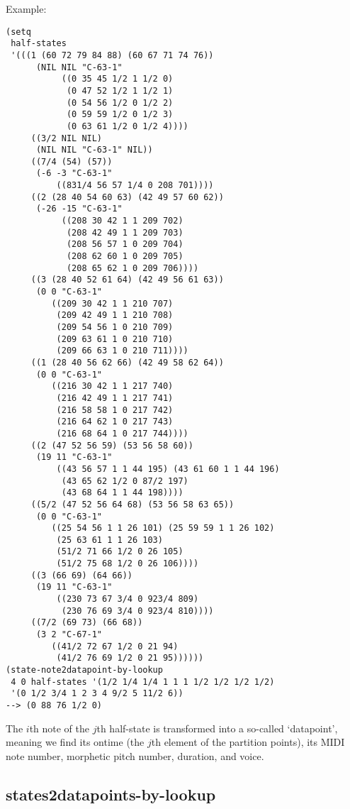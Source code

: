 \vspace{0.5cm}
\noindent Example:
\begin{verbatim}
(setq
 half-states
 '(((1 (60 72 79 84 88) (60 67 71 74 76))
      (NIL NIL "C-63-1"
           ((0 35 45 1/2 1 1/2 0)
            (0 47 52 1/2 1 1/2 1)
            (0 54 56 1/2 0 1/2 2)
            (0 59 59 1/2 0 1/2 3)
            (0 63 61 1/2 0 1/2 4))))
     ((3/2 NIL NIL)
      (NIL NIL "C-63-1" NIL))
     ((7/4 (54) (57))
      (-6 -3 "C-63-1"
          ((831/4 56 57 1/4 0 208 701))))
     ((2 (28 40 54 60 63) (42 49 57 60 62))
      (-26 -15 "C-63-1"
           ((208 30 42 1 1 209 702)
            (208 42 49 1 1 209 703)
            (208 56 57 1 0 209 704)
            (208 62 60 1 0 209 705)
            (208 65 62 1 0 209 706))))
     ((3 (28 40 52 61 64) (42 49 56 61 63))
      (0 0 "C-63-1"
         ((209 30 42 1 1 210 707)
          (209 42 49 1 1 210 708)
          (209 54 56 1 0 210 709)
          (209 63 61 1 0 210 710)
          (209 66 63 1 0 210 711))))
     ((1 (28 40 56 62 66) (42 49 58 62 64))
      (0 0 "C-63-1"
         ((216 30 42 1 1 217 740)
          (216 42 49 1 1 217 741)
          (216 58 58 1 0 217 742)
          (216 64 62 1 0 217 743)
          (216 68 64 1 0 217 744))))
     ((2 (47 52 56 59) (53 56 58 60))
      (19 11 "C-63-1" 
          ((43 56 57 1 1 44 195) (43 61 60 1 1 44 196)
           (43 65 62 1/2 0 87/2 197)
           (43 68 64 1 1 44 198))))
     ((5/2 (47 52 56 64 68) (53 56 58 63 65))
      (0 0 "C-63-1"
         ((25 54 56 1 1 26 101) (25 59 59 1 1 26 102)
          (25 63 61 1 1 26 103)
          (51/2 71 66 1/2 0 26 105)
          (51/2 75 68 1/2 0 26 106))))
     ((3 (66 69) (64 66))
      (19 11 "C-63-1"
          ((230 73 67 3/4 0 923/4 809)
           (230 76 69 3/4 0 923/4 810))))
     ((7/2 (69 73) (66 68))
      (3 2 "C-67-1"
         ((41/2 72 67 1/2 0 21 94)
          (41/2 76 69 1/2 0 21 95))))))
(state-note2datapoint-by-lookup
 4 0 half-states '(1/2 1/4 1/4 1 1 1 1/2 1/2 1/2 1/2)
 '(0 1/2 3/4 1 2 3 4 9/2 5 11/2 6))
--> (0 88 76 1/2 0)
\end{verbatim}

\noindent The $i$th note of the $j$th half-state is transformed
into a so-called `datapoint', meaning we find its
ontime (the $j$th element of the partition points),
its MIDI note number, morphetic pitch number,
duration, and voice.


\subsection*{states2datapoints-by-lookup}\label{fun:states2datapoints-by-lookup}

